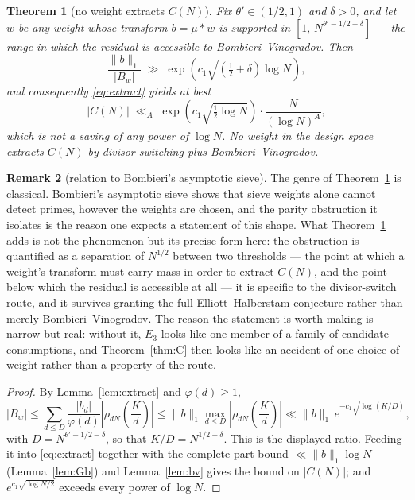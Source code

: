 \documentclass[11pt,a4paper]{article}
\theoremstyle{plain}
\newtheorem{theorem}{Theorem}
\theoremstyle{definition}
\newtheorem{remark}[theorem]{Remark}
\begin{document}
\begin{theorem}[no weight extracts $C(N)$]\label{thm:D}
Fix $\theta'\in(1/2,1)$ and $\delta>0$, and let $w$ be any weight
whose transform $b=\mu*w$ is supported in
$[1,\,N^{\theta'-1/2-\delta}]$ --- the range in which the residual is
accessible to Bombieri--Vinogradov. Then
\[
  \frac{\|b\|_1}{|B_w|} \;\gg\;
   \exp\!\left(c_1\sqrt{(\tfrac12+\delta)\log N}\right),
\]
and consequently \eqref{eq:extract} yields at best
\[
  |C(N)| \;\ll_A\; \exp\!\left(c_1\sqrt{\tfrac12\log N}\right)
   \cdot \frac{N}{(\log N)^{A}},
\]
which is not a saving of any power of $\log N$. No weight in the
design space extracts $C(N)$ by divisor switching plus
Bombieri--Vinogradov.
\end{theorem}

\begin{remark}[relation to Bombieri's asymptotic sieve]
\label{rem:bombieri}
The genre of Theorem~\ref{thm:D} is classical. Bombieri's asymptotic
sieve \cite{Bom76} shows that sieve weights alone cannot detect primes,
however the weights are chosen, and the parity obstruction it isolates
is the reason one expects a statement of this shape. What
Theorem~\ref{thm:D} adds is not the phenomenon but its precise form
here: the obstruction is quantified as a separation of $N^{1/2}$ between
two thresholds --- the point at which a weight's transform must carry
mass in order to extract $C(N)$, and the point below which the residual
is accessible at all --- it is specific to the divisor-switch route, and
it survives granting the full Elliott--Halberstam conjecture rather than
merely Bombieri--Vinogradov. The reason the statement is worth making is
narrow but real: without it, $E_3$ looks like one member of a family of
candidate consumptions, and Theorem~\ref{thm:C} then looks like an
accident of one choice of weight rather than a property of the route.
\end{remark}

\begin{proof}
By Lemma~\ref{lem:extract} and $\varphi(d)\ge1$,
\[
  |B_w| \le \sum_{d\le D}\frac{|b_d|}{\varphi(d)}
    \left|\rho_{dN}\!\left(\frac Kd\right)\right|
  \le \|b\|_1\max_{d\le D}\left|\rho_{dN}\!\left(\frac Kd\right)\right|
  \ll \|b\|_1\,e^{-c_1\sqrt{\log(K/D)}},
\]
with $D=N^{\theta'-1/2-\delta}$, so that
$K/D=N^{1/2+\delta}$. This is the displayed ratio. Feeding it into
\eqref{eq:extract} together with the complete-part bound
$\ll\|b\|_1\log N$ (Lemma~\ref{lem:Gb}) and Lemma~\ref{lem:bv} gives
the bound on $|C(N)|$; and $e^{c_1\sqrt{\log N/2}}$ exceeds every
power of $\log N$.
\end{proof}
\end{document}
